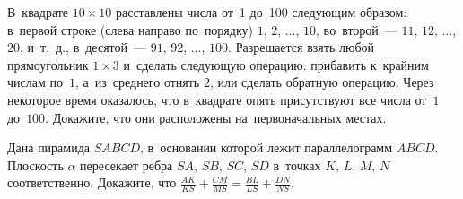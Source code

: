 \begin{problems}
\item
В~квадрате $10 \times 10$ расставлены числа от~1 до~100 следующим образом:
в~первой строке (слева направо по~порядку) $1$, $2$, $\ldots$, $10$,
во~второй~--- $11$, $12$, $\ldots$, $20$,
и~т.~д.,
в~десятой~--- $91$, $92$, $\ldots$, $100$.
Разрешается взять любой прямоугольник $1 \times 3$ и~сделать следующую
операцию: прибавить к~крайним числам по~$1$, а~из~среднего отнять $2$, или
сделать обратную операцию.
Через некоторое время оказалось, что в~квадрате опять присутствуют все числа
от~$1$ до~$100$.
Докажите, что они расположены на~первоначальных местах.

\item
Дана пирамида $SABCD$, в~основании которой лежит параллелограмм $ABCD$.
Плоскость $\alpha$ пересекает ребра $SA$, $SB$, $SC$, $SD$
в~точках $K$, $L$, $M$, $N$ соответственно.
Докажите, что
\(
    \frac{AK}{KS} + \frac{CM}{MS}
=
    \frac{BL}{LS} + \frac{DN}{NS}
\).

\end{problems}

\endgroup %

